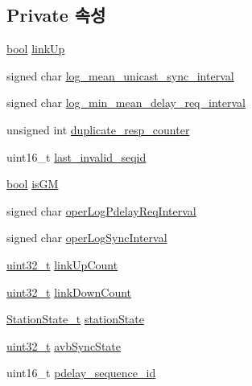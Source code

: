 \subsection*{Private 속성}
\begin{DoxyCompactItemize}
\item 
\hyperlink{avb__gptp_8h_af6a258d8f3ee5206d682d799316314b1}{bool} \hyperlink{class_ether_port_a3e5a0a3ec08db1c42b0f090083c8818d}{link\+Up}
\item 
signed char \hyperlink{class_ether_port_aaa9b3813ab73e017887e3836b349fcbe}{log\+\_\+mean\+\_\+unicast\+\_\+sync\+\_\+interval}
\item 
signed char \hyperlink{class_ether_port_accf45e0b7bc412a8a28e84f736c95e15}{log\+\_\+min\+\_\+mean\+\_\+delay\+\_\+req\+\_\+interval}
\item 
unsigned int \hyperlink{class_ether_port_aef2d1abb41270aca9b47c602f6af5052}{duplicate\+\_\+resp\+\_\+counter}
\item 
uint16\+\_\+t \hyperlink{class_ether_port_a21461d29642cccec51ab8838246128ca}{last\+\_\+invalid\+\_\+seqid}
\item 
\hyperlink{avb__gptp_8h_af6a258d8f3ee5206d682d799316314b1}{bool} \hyperlink{class_ether_port_ac1d89714b4aa7aa5414b44238e26d5a2}{is\+GM}
\item 
signed char \hyperlink{class_ether_port_a3062b4f36651db612ae70061510ccefb}{oper\+Log\+Pdelay\+Req\+Interval}
\item 
signed char \hyperlink{class_ether_port_a5b06dd259daf4e1dd5c6b8d15f9bcabf}{oper\+Log\+Sync\+Interval}
\item 
\hyperlink{parse_8c_a6eb1e68cc391dd753bc8ce896dbb8315}{uint32\+\_\+t} \hyperlink{class_ether_port_ac7f33022bc67fd0d956d7250e283d2e3}{link\+Up\+Count}
\item 
\hyperlink{parse_8c_a6eb1e68cc391dd753bc8ce896dbb8315}{uint32\+\_\+t} \hyperlink{class_ether_port_a9f4a29199ab22297977e8e139d7b8eed}{link\+Down\+Count}
\item 
\hyperlink{avbap__message_8hpp_a0ea424c21354a92be352893d8feeea22}{Station\+State\+\_\+t} \hyperlink{class_ether_port_a91c1bea6a5b70f19ba852e5feb706324}{station\+State}
\item 
\hyperlink{parse_8c_a6eb1e68cc391dd753bc8ce896dbb8315}{uint32\+\_\+t} \hyperlink{class_ether_port_acf739edbc2b48c824240d0be5d07d79c}{avb\+Sync\+State}
\item 
uint16\+\_\+t \hyperlink{class_ether_port_a4dfd3d01701b921f6d7adcdcfd640e60}{pdelay\+\_\+sequence\+\_\+id}
\item 

\end{DoxyCompactItemize}
